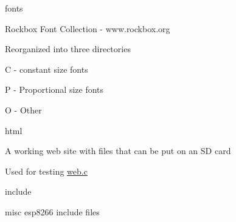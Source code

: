 \begin{DoxyItemize}
\begin{DoxyItemize}
\item fonts
\begin{DoxyItemize}
\item Rockbox Font Collection -\/ www.\+rockbox.\+org
\item Reorganized into three directories
\begin{DoxyItemize}
\item C -\/ constant size fonts
\item P -\/ Proportional size fonts
\item O -\/ Other
\end{DoxyItemize}
\end{DoxyItemize}
\end{DoxyItemize}
\end{DoxyItemize}

html
\begin{DoxyItemize}
\item A working web site with files that can be put on an SD card
\begin{DoxyItemize}
\item Used for testing \hyperlink{web_8c}{web.\+c}
\end{DoxyItemize}
\end{DoxyItemize}

include
\begin{DoxyItemize}
\item misc esp8266 include files
\end{DoxyItemize}

